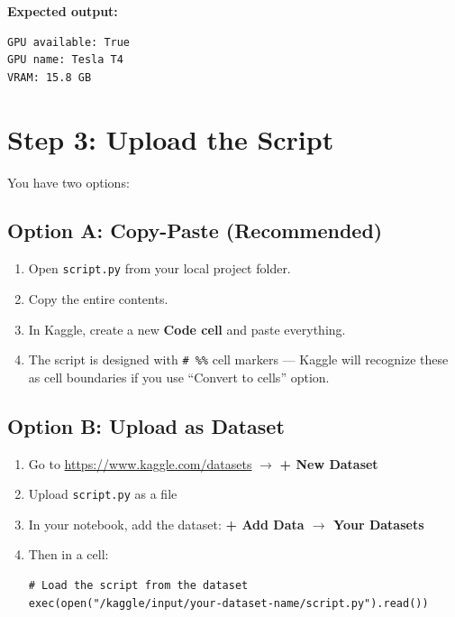 \documentclass[11pt, a4paper]{article}
\begin{document}
\textbf{Expected output:}
\begin{lstlisting}[style=bash]
GPU available: True
GPU name: Tesla T4
VRAM: 15.8 GB
\end{lstlisting}

\section{Step 3: Upload the Script}

You have two options:

\subsection{Option A: Copy-Paste (Recommended)}

\begin{enumerate}
    \item Open \texttt{script.py} from your local project folder.
    \item Copy the entire contents.
    \item In Kaggle, create a new \textbf{Code cell} and paste everything.
    \item The script is designed with \texttt{\# \%\%} cell markers --- Kaggle will recognize these as cell boundaries if you use ``Convert to cells'' option.
\end{enumerate}

\subsection{Option B: Upload as Dataset}

\begin{enumerate}
    \item Go to \url{https://www.kaggle.com/datasets} $\rightarrow$ \textbf{+ New Dataset}
    \item Upload \texttt{script.py} as a file
    \item In your notebook, add the dataset: \textbf{+ Add Data $\rightarrow$ Your Datasets}
    \item Then in a cell:
\begin{lstlisting}[style=python]
# Load the script from the dataset
exec(open("/kaggle/input/your-dataset-name/script.py").read())
\end{lstlisting}
\end{enumerate}
\end{document}
